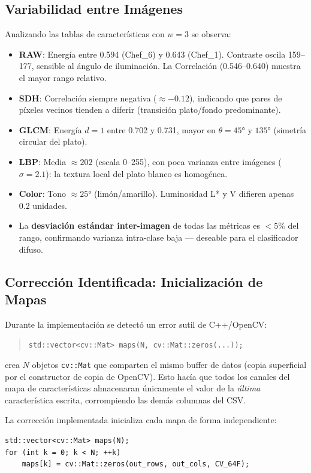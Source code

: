 \documentclass[12pt,a4paper]{article}
\begin{document}
\subsection{Variabilidad entre Imágenes}

Analizando las tablas de características con $w=3$ se observa:

\begin{itemize}[nosep]
  \item \textbf{RAW}: Energía entre 0.594 (Chef\_6) y 0.643 (Chef\_1).
        Contraste oscila 159–177, sensible al ángulo de iluminación.
        La Correlación (0.546–0.640) muestra el mayor rango relativo.
  \item \textbf{SDH}: Correlación siempre negativa ($\approx -0.12$),
        indicando que pares de píxeles vecinos tienden a diferir
        (transición plato/fondo predominante).
  \item \textbf{GLCM}: Energía $d=1$ entre 0.702 y 0.731, mayor en
        $\theta=45°$ y $135°$ (simetría circular del plato).
  \item \textbf{LBP}: Media $\approx 202$ (escala 0–255), con poca
        varianza entre imágenes ($\sigma=2.1$): la textura local del
        plato blanco es homogénea.
  \item \textbf{Color}: Tono $\approx 25°$ (limón/amarillo).
        Luminosidad L* y V difieren apenas 0.2 unidades.
  \item La \textbf{desviación estándar inter-imagen} de todas las
        métricas es $< 5\%$ del rango, confirmando varianza
        intra-clase baja — deseable para el clasificador difuso.
\end{itemize}

\subsection{Corrección Identificada: Inicialización de Mapas}

Durante la implementación se detectó un error sutil de C++/OpenCV:
\begin{quote}
  \texttt{std::vector<cv::Mat> maps(N, cv::Mat::zeros(...));}
\end{quote}
crea $N$ objetos \texttt{cv::Mat} que comparten el mismo buffer de
datos (copia superficial por el constructor de copia de OpenCV).
Esto hacía que todos los canales del mapa de características
almacenaran únicamente el valor de la \textit{última} característica
escrita, corrompiendo las demás columnas del CSV.

La corrección implementada inicializa cada mapa de forma
independiente:
\begin{verbatim}
std::vector<cv::Mat> maps(N);
for (int k = 0; k < N; ++k)
    maps[k] = cv::Mat::zeros(out_rows, out_cols, CV_64F);
\end{verbatim}
\end{document}
